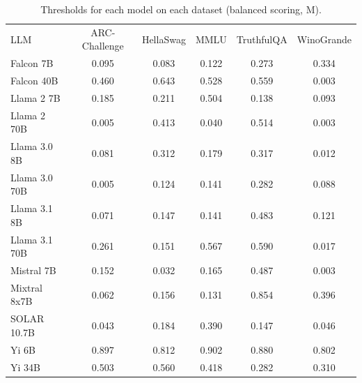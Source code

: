 \begin{table}[h]
\caption{Thresholds for each model on each dataset (balanced scoring, M). }
\label{tab:thresholds_prob_margin_k20_w1}
\centering
\begin{tabular}{l S[table-format=3.1] S[table-format=3.1] S[table-format=3.1] S[table-format=3.1] S[table-format=3.1]}
\toprule
LLM & ARC-Challenge & HellaSwag & MMLU & TruthfulQA & WinoGrande \\ 
\cmidrule(lr){1-1} \cmidrule(lr){2-2} \cmidrule(lr){3-3} \cmidrule(lr){4-4} \cmidrule(lr){5-5} \cmidrule(lr){6-6}
Falcon 7B & 0.095 & 0.083 & 0.122 & 0.273 & 0.334\\
Falcon 40B & 0.460 & 0.643 & 0.528 & 0.559 & 0.003\\
Llama 2 7B & 0.185 & 0.211 & 0.504 & 0.138 & 0.093\\
Llama 2 70B & 0.005 & 0.413 & 0.040 & 0.514 & 0.003\\
Llama 3.0 8B & 0.081 & 0.312 & 0.179 & 0.317 & 0.012\\
Llama 3.0 70B & 0.005 & 0.124 & 0.141 & 0.282 & 0.088\\
Llama 3.1 8B & 0.071 & 0.147 & 0.141 & 0.483 & 0.121\\
Llama 3.1 70B & 0.261 & 0.151 & 0.567 & 0.590 & 0.017\\
Mistral 7B & 0.152 & 0.032 & 0.165 & 0.487 & 0.003\\
Mixtral 8x7B & 0.062 & 0.156 & 0.131 & 0.854 & 0.396\\
SOLAR 10.7B & 0.043 & 0.184 & 0.390 & 0.147 & 0.046\\
Yi 6B & 0.897 & 0.812 & 0.902 & 0.880 & 0.802\\
Yi 34B & 0.503 & 0.560 & 0.418 & 0.282 & 0.310\\
\bottomrule
\end{tabular}
\end{table}
